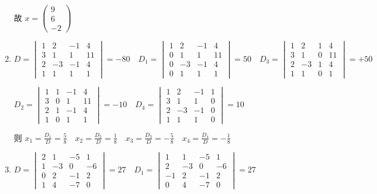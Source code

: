 \begin{enumerate}
			      故 \( x = \begin{pmatrix}
				      9 \\
				      6 \\
				      -2
			      \end{pmatrix} \)
			\item %
			      \( D = \begin{vmatrix}
				      1 & 2  & -1 & 4  \\
				      3 & 1  & 1  & 11 \\
				      2 & -3 & -1 & 4  \\
				      1 & 1  & 1  & 1
			      \end{vmatrix} = -80 \quad D_{1} = \begin{vmatrix}
				      1 & 2  & -1 & 4  \\
				      0 & 1  & 1  & 11 \\
				      0 & -3 & -1 & 4  \\
				      0 & 1  & 1  & 1
			      \end{vmatrix} = 50 \quad D_{3} = \begin{vmatrix}
				      1 & 2  & 1 & 4  \\
				      3 & 1  & 0 & 11 \\
				      2 & -3 & 1 & 4  \\
				      1 & 1  & 0 & 1
			      \end{vmatrix} = +50 \)

			      \( D_{2} = \begin{vmatrix}
				      1 & 1 & -1 & 4  \\
				      3 & 0 & 1  & 11 \\
				      2 & 1 & -1 & 4  \\
				      1 & 0 & 1  & 1
			      \end{vmatrix} = -10 \quad D_{4} = \begin{vmatrix}
				      1 & 2  & -1 & 1 \\
				      3 & 1  & 1  & 0 \\
				      2 & -3 & -1 & 0 \\
				      1 & 1  & 1  & 0
			      \end{vmatrix} = 10 \)

			      则 \( x_{1} = \frac{D_{1}}{D} = \frac{5}{8} \quad x_{2} = \frac{D_{2}}{D} = \frac{1}{8} \quad x_{3} = \frac{D_{3}}{D} = -\frac{5}{8} \quad x_{4} = \frac{D_{4}}{D} = -\frac{1}{8} \)
			\item %
			      \( D = \begin{vmatrix}
				      2 & 1  & -5 & 1  \\
				      1 & -3 & 0  & -6 \\
				      0 & 2  & -1 & 2  \\
				      1 & 4  & -7 & 0
			      \end{vmatrix} = 27 \quad D_{1} = \begin{vmatrix}
				      1  & 1  & -5 & 1  \\
				      2  & -3 & 0  & -6 \\
				      -1 & 2  & -1 & 2  \\
				      0  & 4  & -7 & 0
			      \end{vmatrix} = 27 \)


\end{enumerate}

